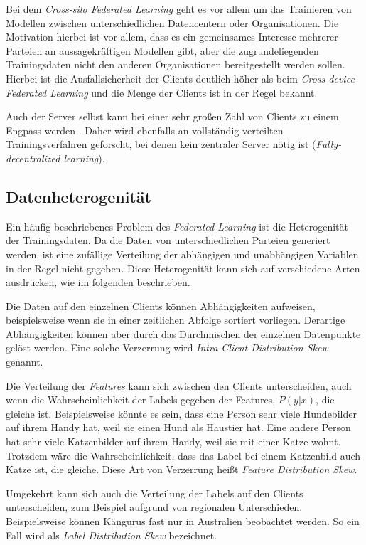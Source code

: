 Bei dem \textit{Cross-silo Federated Learning} geht es vor allem um das Trainieren von Modellen zwischen unterschiedlichen Datencentern oder Organisationen. Die Motivation hierbei ist vor allem, dass es ein gemeinsames Interesse mehrerer Parteien an aussagekräftigen Modellen gibt, aber die zugrundeliegenden Trainingsdaten nicht den anderen Organisationen bereitgestellt werden sollen. Hierbei ist die Ausfallsicherheit der Clients deutlich höher als beim \textit{Cross-device Federated Learning} und die Menge der Clients ist in der Regel bekannt.

Auch der Server selbst kann bei einer sehr großen Zahl von Clients zu einem Engpass werden \cite[p.11]{kairouz:2021}. Daher wird ebenfalls an vollständig verteilten Trainingsverfahren geforscht, bei denen kein zentraler Server nötig ist (\textit{Fully-decentralized learning}).

\subsection{Datenheterogenität}\label{fund-fl-data-heterogenity}

Ein häufig beschriebenes Problem des \textit{Federated Learning} ist die Heterogenität der Trainingsdaten. Da die Daten von unterschiedlichen Parteien generiert werden, ist eine zufällige Verteilung der abhängigen und unabhängigen Variablen in der Regel nicht gegeben. Diese Heterogenität kann sich auf verschiedene Arten ausdrücken, wie im folgenden beschrieben.

Die Daten auf den einzelnen Clients können Abhängigkeiten aufweisen, beispielsweise wenn sie in einer zeitlichen Abfolge sortiert vorliegen. Derartige Abhängigkeiten können aber durch das Durchmischen der einzelnen Datenpunkte gelöst werden. Eine solche Verzerrung wird \textit{Intra-Client Distribution Skew} genannt.

Die Verteilung der \textit{Features} kann sich zwischen den Clients unterscheiden, auch wenn die Wahrscheinlichkeit der Labels gegeben der Features, $P(y|x)$, die gleiche ist. Beispielsweise könnte es sein, dass eine Person sehr viele Hundebilder auf ihrem Handy hat, weil sie einen Hund als Haustier hat. Eine andere Person hat sehr viele Katzenbilder auf ihrem Handy, weil sie mit einer Katze wohnt. Trotzdem wäre die Wahrscheinlichkeit, dass das Label bei einem Katzenbild auch Katze ist, die gleiche. Diese Art von Verzerrung heißt \textit{Feature Distribution Skew}.

Umgekehrt kann sich auch die Verteilung der Labels auf den Clients unterscheiden, zum Beispiel aufgrund von regionalen Unterschieden. Beispielsweise können Kängurus fast nur in Australien beobachtet werden. So ein Fall wird als \textit{Label Distribution Skew} bezeichnet.

